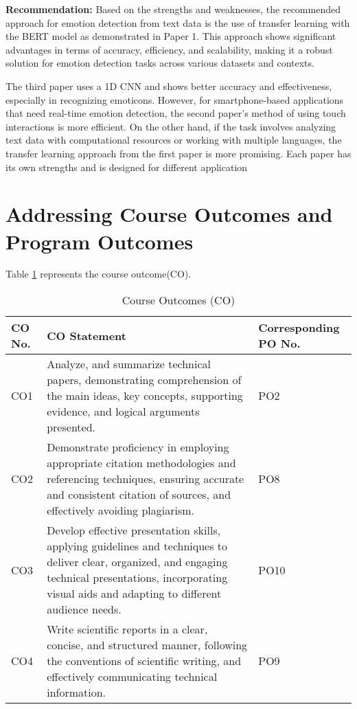 \documentclass[12pt]{article} %
\begin{document}
\newpage
\textbf{Recommendation: }
Based on the strengths and weaknesses, the recommended approach for emotion detection from text data is the use of transfer learning with the BERT model as demonstrated in Paper 1. This approach shows significant advantages in terms of accuracy, efficiency, and scalability, making it a robust solution for emotion detection tasks across various datasets and contexts.

The third paper uses a 1D CNN and shows better accuracy and effectiveness, especially in recognizing emoticons. However, for smartphone-based applications that need real-time emotion detection, the second paper's method of using touch interactions is more efficient. On the other hand, if the task involves analyzing text data with computational resources or working with multiple languages, the transfer learning approach from the first paper is more promising. Each paper has its own strengths and is designed for different application

\section{Addressing Course Outcomes and Program Outcomes}
Table \ref{tab:co} represents the course outcome(CO).
\begin{table}[h]
    \centering
    \caption{Course Outcomes (CO)}
    \label{tab:co}
    \begin{tabular}{|>{\centering\arraybackslash}m{0.8cm}|>{\centering\arraybackslash}m{7cm}|>{\centering\arraybackslash}m{5cm}|}
        \hline
        \textbf{CO No.} & \textbf{CO Statement} & \textbf{Corresponding PO No.} \\
        \hline
        CO1 & Analyze, and summarize technical papers, demonstrating comprehension of the main ideas, key concepts, supporting evidence, and logical arguments presented. & PO2 \\
        \hline
        CO2 & Demonstrate proficiency in employing appropriate citation methodologies and referencing techniques, ensuring accurate and consistent citation of sources, and effectively avoiding plagiarism. & PO8 \\
        \hline
        CO3 & Develop effective presentation skills, applying guidelines and techniques to deliver clear, organized, and engaging technical presentations, incorporating visual aids and adapting to different audience needs. & PO10 \\
        \hline
        CO4 & Write scientific reports in a clear, concise, and structured manner, following the conventions of scientific writing, and effectively communicating technical information. & PO9 \\
        \hline
    \end{tabular}
    
\end{table}
\newpage
\end{document}
